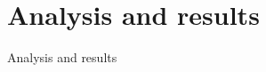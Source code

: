 \documentclass{beamer}
\begin{document}
\section{Analysis and results}


\begin{frame}{Analysis and results}

\tableofcontents[currentsection]
 
\end{frame}
\end{document}
